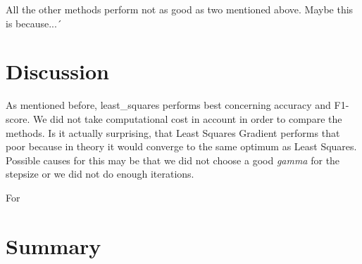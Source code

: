 \documentclass[10pt,conference,compsocconf]{IEEEtran}
\begin{document}
All the other methods perform not as good as two mentioned above. Maybe this is because...´

\section{Discussion}

As mentioned before, least\_squares performs best concerning accuracy and F1-score. We did not take computational cost in account in order to compare the methods.
Is it actually surprising, that Least Squares Gradient performs that poor because in theory it would converge to the same optimum as Least Squares. Possible causes for this may be that we did not choose a good \textit{gamma} for the stepsize or we did not do enough iterations. 

For 


\section{Summary}






\end{document}
